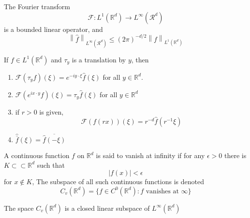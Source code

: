 \documentclass{article}
\newcommand{\norm}[1]{\left\lVert#1\right\rVert}
\begin{document}
\begin{proposition}
  The Fourier transform
  \begin{equation*}
    \mathcal{F}: L^1(\mathbb{R}^d) \to L^\infty (\mathcal{R}^d)
  \end{equation*}
  is a bounded linear operator, and 
  \begin{equation*}
    \norm{\hat{f}}_{L^\infty (\mathcal{R}^d)} \leq (2\pi)^{-d/2} \norm{f}_{L^1(\mathbb{R}^d)}
  \end{equation*}
\end{proposition}

\begin{proposition}
  If $f \in L^1(\mathbb{R}^d)$ and $\tau_y$ is a translation by $y$, then
  \begin{enumerate}
  \item $\mathcal{F}(\tau_yf)(\xi) = e^{-iy \cdot \xi}\hat{f}(\xi)$ for all $y \in \mathbb{R}^d$. 
\item $\mathcal{F}(e^{ix \cdot y}f)(\xi) = \tau_y \hat{f}(\xi)$ for all $y \in \mathbb{R}^d$ 
    \item if $r > 0$ is given,
      \begin{equation*}
        \mathcal{F}(f(rx))(\xi) = r^{-d}\hat{f}(r^{-1}\xi)
      \end{equation*}
  
    \item $\hat{\bar{f}}(\xi) = \overline{\hat{f}(-\xi)}$
  \end{enumerate}
\end{proposition}

\begin{principle}
  A continuous function $f$ on $\mathbb{R}^d$ is said to vanish at infinity if for any $\epsilon > 0$ there is $K \subset\subset \mathbb{R}^d$ such that
  \begin{equation*}
    |f(x)| < \epsilon
  \end{equation*}
  for $x \not\in K$, The subspace of all such continuous functions is denoted
  \begin{equation*}
    C_v(\mathbb{R}^d) = \{f \in C^0(\mathbb{R}^d): \text{$f$ vanishes at $\infty$}\}
  \end{equation*}
\end{principle}

\begin{theorem}
  The space $C_v(\mathbb{R}^d)$ is a closed linear subspace of $L^\infty(\mathbb{R}^d)$
\end{theorem}
\end{document}
